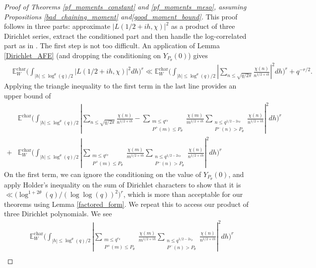 \documentclass[reqno]{amsart}
\theoremstyle{definition}
\theoremstyle{remark}
\numberwithin{equation}{section}
\theoremstyle{remark}
\begin{document}
\begin{proof}[Proof of Theorems \ref{pf_moments_constant} and \ref{pf_moments_meso}, assuming Propositions \ref{bad_chaining_moment} and\ref{good_moment_bound}]
    This proof follows in three parts: approximate $|L(1/2+ih,\chi)|^2$ as a product of three Dirichlet series, extract the conditioned part and then handle the log-correlated part as in \cite{harper2019partition}. The first step is not too difficult. An application of Lemma \ref{Dirichlet_AFE} (and dropping the conditioning on $Y_{P_\theta}(0)$) gives
    \begin{align*}
        &\mathbb{E}_W^{\text{char}}\big(\int_{|h| \leq \log^{\theta}(q)/2}|L(1/2+ih,\chi)|^2dh\big)^r 
        \ll \mathbb{E}_W^{\text{char}}\big(\int_{|h| \leq \log^\theta(q)/2}|\sum_{n \leq \sqrt{q/2\pi}}\frac{\chi(n)}{n^{1/2+ih}}|^2dh\big)^r + q^{-r/2}.
    \end{align*}
    Applying the triangle inequality to the first term in the last line provides an upper bound of
    \begin{align*}
        &\mathbb{E}^{\text{char}}\big(\int_{|h| \leq \log^{\theta}(q)/2}|\sum_{n \leq \sqrt{q/2\pi}}\frac{\chi(n)}{n^{1/2+ih}}-\sum_{\substack{m \leq q^{\varepsilon_\theta} \\ P^+(m) \leq P_\theta}}\frac{\chi(m)}{m^{1/2+ih}}\sum_{\substack{n \leq q^{1/2-2\varepsilon_\theta} \\ P^-(n) > P_\theta}}\frac{\chi(n)}{n^{1/2+ih}}|^2dh\big)^r \\ 
        +& \mathbb{E}_W^{\text{char}}\big(\int_{|h| \leq \log^\theta(q)/2}|\sum_{\substack{m \leq q^{\varepsilon_\theta} \\ P^+(m) \leq P_\theta}}\frac{\chi(m)}{m^{1/2+ih}}\sum_{\substack{n \leq q^{1/2-2\varepsilon_\theta} \\ P^-(n) > P_\theta}}\frac{\chi(n)}{n^{1/2+ih}}|^2dh\big)^r
    \end{align*}
    On the first term, we can ignore the conditioning on the value of $Y_{P_\theta}(0)$, and apply Holder's inequality on the sum of Dirichlet characters to show that it is
    $\ll \big(\log^{1+2\theta}(q)/(\log\log(q))^2\big)^r$,
    which is more than acceptable for our theorems using Lemma \ref{factored_form}. We repeat this to access our product of three Dirichlet polynomials. We see 
    \begin{align*}
        &\mathbb{E}_W^{\text{char}}\big(\int_{|h| \leq \log^\theta(q)/2}|\sum_{\substack{m \leq q^{\varepsilon_\theta} \\ P^+(m) \leq P_\theta}}\frac{\chi(m)}{m^{1/2+ih}}\sum_{\substack{n \leq q^{1/2-2\varepsilon_\theta} \\ P^-(n) > P_\theta}}\frac{\chi(n)}{n^{1/2+ih}}|^2dh\big)^r \\

\end{align*}
\end{proof}
\end{document}
